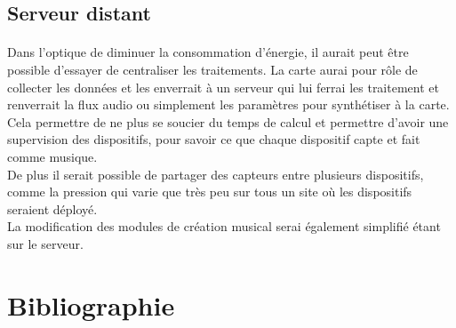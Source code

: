 \documentclass[a4paper, titlepage, oneside, 12pt]{article}%
\begin{document}
\subsection{Serveur distant}
\paragraph{}
Dans l'optique de diminuer la consommation d’énergie, il aurait peut être possible d'essayer de centraliser les traitements. La carte aurai pour rôle de collecter les données et les enverrait à un serveur qui lui ferrai les traitement et renverrait la flux audio ou simplement les paramètres pour synthétiser à la carte.\\
Cela permettre de ne plus se soucier du temps de calcul et permettre d'avoir une supervision des dispositifs, pour savoir ce que chaque dispositif capte et fait comme musique.\\
De plus il serait possible de partager des capteurs entre plusieurs dispositifs, comme la pression qui varie que très peu sur tous un site où les dispositifs seraient déployé.\\
La modification des modules de création musical serai également simplifié étant sur le serveur.
 

\newpage
\section{Bibliographie}
\nocite{*}


\end{document}
